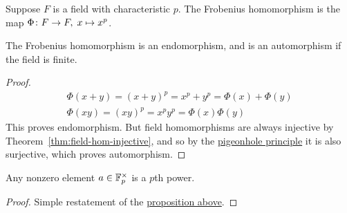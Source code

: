 \begin{definition}
    Suppose \(F\) is a field with characteristic \(p\).
    The Frobenius homomorphism is the map \(\Phi\colon F\to F,\;x\mapsto x^p\).
\end{definition}
\begin{proposition}\label{prop:frobenius-hom}
    The Frobenius homomorphism is an endomorphism,
    and is an automorphism if the field is finite.
\end{proposition}
\begin{proof}
    \begin{gather*}
        \Phi(x+y) = {(x+y)}^p = x^p + y^p = \Phi(x) + \Phi(y) \\
        \Phi(xy) = {(xy)}^p = x^p y^p = \Phi(x)\Phi(y)
    \end{gather*}
    This proves endomorphism.
    But field homomorphisms are always injective
    by Theorem~\ref{thm:field-hom-injective},
    and so by the \hyperref[thm:pigeonhole]{pigeonhole principle}
    it is also surjective,
    which proves automorphism.
\end{proof}
\begin{corollary}
    Any nonzero element \(a \in \mathbb{F}_p^\times\) is a \(p\)th power.
\end{corollary}
\begin{proof}
    Simple restatement of the \hyperref[prop:frobenius-hom]{proposition above}.
\end{proof}

